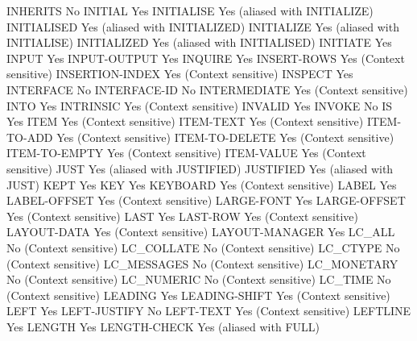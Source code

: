 INHERITS                        No
INITIAL                         Yes
INITIALISE                      Yes (aliased with INITIALIZE)
INITIALISED                     Yes (aliased with INITIALIZED)
INITIALIZE                      Yes (aliased with INITIALISE)
INITIALIZED                     Yes (aliased with INITIALISED)
INITIATE                        Yes
INPUT                           Yes
INPUT-OUTPUT                    Yes
INQUIRE                         Yes
INSERT-ROWS                     Yes (Context sensitive)
INSERTION-INDEX                 Yes (Context sensitive)
INSPECT                         Yes
INTERFACE                       No
INTERFACE-ID                    No
INTERMEDIATE                    Yes (Context sensitive)
INTO                            Yes
INTRINSIC                       Yes (Context sensitive)
INVALID                         Yes
INVOKE                          No
IS                              Yes
ITEM                            Yes (Context sensitive)
ITEM-TEXT                       Yes (Context sensitive)
ITEM-TO-ADD                     Yes (Context sensitive)
ITEM-TO-DELETE                  Yes (Context sensitive)
ITEM-TO-EMPTY                   Yes (Context sensitive)
ITEM-VALUE                      Yes (Context sensitive)
JUST                            Yes (aliased with JUSTIFIED)
JUSTIFIED                       Yes (aliased with JUST)
KEPT                            Yes
KEY                             Yes
KEYBOARD                        Yes (Context sensitive)
LABEL                           Yes
LABEL-OFFSET                    Yes (Context sensitive)
LARGE-FONT                      Yes
LARGE-OFFSET                    Yes (Context sensitive)
LAST                            Yes
LAST-ROW                        Yes (Context sensitive)
LAYOUT-DATA                     Yes (Context sensitive)
LAYOUT-MANAGER                  Yes
LC_ALL                          No (Context sensitive)
LC_COLLATE                      No (Context sensitive)
LC_CTYPE                        No (Context sensitive)
LC_MESSAGES                     No (Context sensitive)
LC_MONETARY                     No (Context sensitive)
LC_NUMERIC                      No (Context sensitive)
LC_TIME                         No (Context sensitive)
LEADING                         Yes
LEADING-SHIFT                   Yes (Context sensitive)
LEFT                            Yes
LEFT-JUSTIFY                    No
LEFT-TEXT                       Yes (Context sensitive)
LEFTLINE                        Yes
LENGTH                          Yes
LENGTH-CHECK                    Yes (aliased with FULL)
